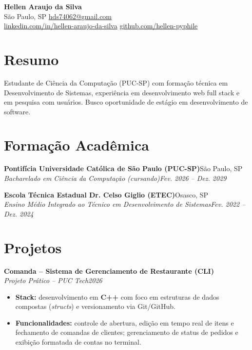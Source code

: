 \documentclass[a4paper,11pt]{article}
\newcommand{\entry}[4]{%
  \vspace{3pt}
  \noindent\textbf{#1}\hfill #2\\
  \textit{#3}\hfill\textit{#4}\par
}
\begin{document}
\begin{center}
  {\LARGE\bfseries Hellen Araujo da Silva}\\[4pt]
  São Paulo, SP \textbar{} \href{mailto:hds74062@gmail.com}{hds74062@gmail.com} \\
  \href{https://www.linkedin.com/in/hellen-araujo-da-silva-550b86322/}{linkedin.com/in/hellen-araujo-da-silva}
  \textbar{} \href{https://github.com/hellen-pyphile}{github.com/hellen-pyphile}
\end{center}

\section{Resumo}
Estudante de Ciência da Computação (PUC-SP) com formação técnica em Desenvolvimento
de Sistemas, experiência em desenvolvimento web full stack e em pesquisa com usuários.
Busco oportunidade de estágio em desenvolvimento de software.

\section{Formação Acadêmica}
\entry{Pontifícia Universidade Católica de São Paulo (PUC-SP)}{São Paulo, SP}
  {Bacharelado em Ciência da Computação (cursando)}{Fev. 2026 -- Dez. 2029}
\entry{Escola Técnica Estadual Dr. Celso Giglio (ETEC)}{Osasco, SP}
  {Ensino Médio Integrado ao Técnico em Desenvolvimento de Sistemas}{Fev. 2022 -- Dez. 2024}

\section{Projetos}
\entry{Comanda -- Sistema de Gerenciamento de Restaurante (CLI)}{}
  {Projeto Prático -- PUC Tech}{2026}
\begin{itemize}
  \item \textbf{Stack:} desenvolvimento em \textbf{C++} com foco em estruturas de dados compostas (\textit{structs}) e versionamento via Git/GitHub.
  \item \textbf{Funcionalidades:} controle de abertura, edição em tempo real de itens e fechamento de comandas de clientes; gerenciamento de status de pedidos e exibição formatada de contas no terminal.
\end{itemize}
\end{document}
